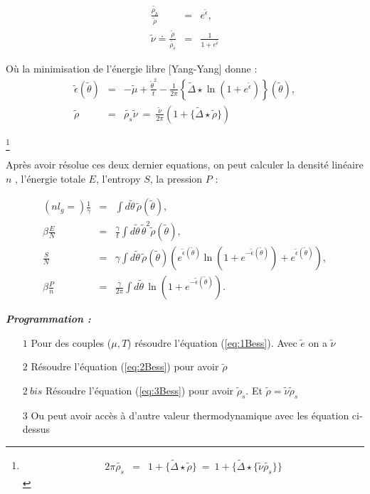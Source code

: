 \begin{eqnarray}
	\frac{\tilde{\rho_h}}{\tilde{\rho}} & = & e^{\tilde{\epsilon} }, \\
	\tilde{\nu} \doteq \frac{\tilde{\rho}}{\tilde{\rho_s}} & = & \frac{1}{1+ e ^{\tilde{\epsilon}} }	
\end{eqnarray}

Où la minimisation de l'énergie libre [Yang-Yang] donne :
\begin{eqnarray}
	\tilde{\epsilon} ( \tilde{\theta} ) & = & - \tilde{\mu} + \frac{\tilde{\theta}^2 }{t} - \frac{1}{2 \pi} \left \{\tilde{\Delta} \star \ln \left ( 1 + e^{\tilde{\epsilon}} \right )  \right \} ( \tilde{\theta} ), \label{eq:1Bess}\\
	\tilde{\rho} &=& \tilde{\rho_s} \tilde{\nu}   ~=~   \frac{\tilde{\nu}}{2 \pi}  ( 1 + \{ \tilde{\Delta} \star \tilde{\rho} \} ) 	 \label{eq:2Bess}
\end{eqnarray}

\footnote{\begin{eqnarray} 2\pi \tilde{\rho_s}  & =  &  1 + \{ \tilde{\Delta} \star \tilde{\rho} \} ~= ~ 1 + \{ \tilde{\Delta} \star \{\tilde{\nu} \tilde{\rho_s}\} \}  \label{eq:3Bess}\end{eqnarray}}

Après avoir résolue ces deux dernier equations, on peut calculer la densité linéaire $n$ , l'énergie totale $E$, l'entropy $S$, la pression $P$ : 

\begin{eqnarray}\label{eq:5Bess}
	(nl_g = ) \frac{1}{\gamma} & = & \int d \tilde{\theta} \,\tilde{\rho}(\tilde{\theta}), \\
	\beta \frac{E}{N} & = & \frac{\gamma}{t} \int d \tilde{\theta}\,  \tilde{\theta}^2 \tilde{\rho}(\tilde{\theta}), \\
	\frac{S}{N} & = & \gamma 	\int d \tilde{\theta} \,\tilde{\rho}(\tilde{\theta}) \left ( e^{\tilde{\epsilon}(\tilde{\theta})} \ln \left ( 1 + e^{-\tilde{\epsilon}(\tilde{\theta})}  \right ) + e^{\tilde{\epsilon}(\tilde{\theta})} \right )  ,\\
	\beta \frac{P}{n}  & = & \frac{\gamma}{2 \pi} \int d \tilde{\theta} \, \ln \left ( 1 + e^{-\tilde{\epsilon}(\tilde{\theta})}  \right ).
\end{eqnarray}


{ \bf \em Programmation :}

\begin{itemize}
	\item[$1$] Pour des couples ($\mu , T $) résoudre l'équation (\ref{eq:1Bess}). Avec $\tilde{e}$ on a $\tilde{\nu}$
	\item[$2$] Résoudre l'équation (\ref{eq:2Bess}) pour avoir $\tilde{\rho}$
	\item[$2 ~bis$] Résoudre l'équation (\ref{eq:3Bess}) pour avoir $\tilde{\rho}_s$. Et $\tilde{\rho} = \tilde{\nu} \tilde{\rho}_s$
	\item[$3$] Ou peut avoir accès à d'autre valeur thermodynamique avec les équation ci-dessus
\end{itemize}

